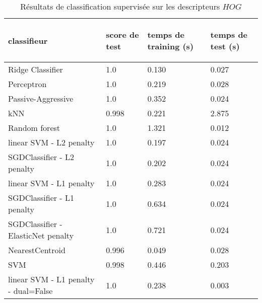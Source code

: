 \documentclass{book}
\begin{document}
\begin{table}
\begin{center}
\begin{tabular}{|p{5cm}|p{2cm}|p{2cm}|p{2cm}|}
\hline
\begin{bf}classifieur\end{bf}& \begin{bf}score de test\end{bf} & \begin{bf}temps de training (s)\end{bf} & \begin{bf}temps de test (s)\end{bf} \\
\hline
Ridge Classifier & 1.0 & 0.130 & 0.027\\
\hline
Perceptron & 1.0 & 0.219 & 0.028\\
\hline
Passive-Aggressive & 1.0 & 0.352 & 0.024\\
\hline
kNN & 0.998 & 0.221 & 2.875\\
\hline
Random forest & 1.0 & 1.321 & 0.012\\
\hline
linear SVM - L2 penalty & 1.0 & 0.197 & 0.024\\
\hline
SGDClassifier - L2 penalty & 1.0 & 0.202 & 0.024\\
\hline
linear SVM - L1 penalty & 1.0 & 0.283 & 0.024\\
\hline
SGDClassifier - L1 penalty & 1.0 & 0.634 & 0.024\\
\hline
SGDClassifier - ElasticNet penalty & 1.0 & 0.721 & 0.024\\
\hline
NearestCentroid & 0.996 & 0.049 & 0.028\\
\hline
SVM & 0.998 & 0.446 & 0.203\\
\hline
linear SVM - L1 penalty - dual=False & 1.0 & 0.238 & 0.003\\
\hline
\end{tabular}
\end{center}
\caption{Résultats de classification supervisée sur les descripteurs $HOG$}
\label{Table_resultats_hog}
\end{table}
\end{document}
